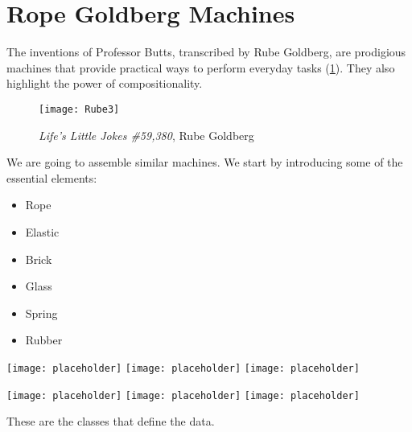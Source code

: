 

\section{Rope Goldberg Machines}

The inventions of Professor Butts, transcribed by Rube Goldberg, are prodigious machines that provide practical ways to perform everyday tasks (\cref{fig:Rube3}). They also highlight the power of compositionality.

\begin{figure}[h]
  \texttt{[image: Rube3]}
  \caption{\emph{Life’s Little Jokes \#59,380}, Rube Goldberg}
  \label{fig:Rube3}
\end{figure}



We are going to assemble similar machines. We start by introducing some of the essential elements:

\begin{itemize}
  \item Rope
  \item Elastic
  \item Brick
  \item Glass
  \item Spring
  \item Rubber
\end{itemize}

\hfill
\texttt{[image: placeholder]}
\hfill
\texttt{[image: placeholder]}
\hfill
\texttt{[image: placeholder]}
\hfill

\hfill
\texttt{[image: placeholder]}
\hfill
\texttt{[image: placeholder]}
\hfill
\texttt{[image: placeholder]}
\hfill





These are the classes that define the data.


